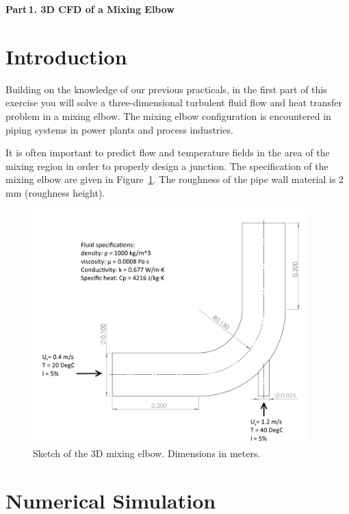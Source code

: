 \documentclass[12pts,a4paper,amsmath,amssymb,floatfix]{article}%
\begin{document}
\bigskip
\begin{center}
\Large{\bf Part\,1. 3D CFD of a Mixing Elbow}
\end{center}

\section{Introduction}
Building on the knowledge of our previous practicals, in the first part of this exercise you will solve a three-dimensional turbulent fluid flow and heat transfer problem in a mixing elbow. The mixing elbow configuration is encountered in piping systems in power plants and process industries. 

It is often important to predict flow and temperature fields in the area of the mixing region in order to properly design a junction. The specification of the mixing elbow are given in Figure~\ref{Design1:Sketch1}. The roughness of the pipe wall material is 2\,mm (roughness height). 
\begin{figure}[H]
\begin{center}
\includegraphics[width=0.95\textwidth,clip]{./Pics/elbow_sketch.png}
\end{center}
\caption{Sketch of the 3D mixing elbow. Dimensions in meters.}\label{Design1:Sketch1}
\end{figure}

\section{Numerical Simulation}
\end{document}
